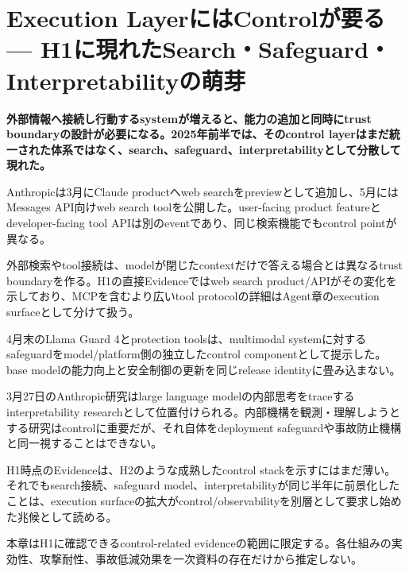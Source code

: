 \section{Execution LayerにはControlが要る — H1に現れたSearch・Safeguard・Interpretabilityの萌芽}
\noindent\textbf{外部情報へ接続し行動するsystemが増えると、能力の追加と同時にtrust boundaryの設計が必要になる。2025年前半では、そのcontrol layerはまだ統一された体系ではなく、search、safeguard、interpretabilityとして分散して現れた。}\autocite{src-383476bdf62e,src-6e15bd50b7db,src-fdc10e3226e6}

Anthropicは3月にClaude productへweb searchをpreviewとして追加し、5月にはMessages API向けweb search toolを公開した。user-facing product featureとdeveloper-facing tool APIは別のeventであり、同じ検索機能でもcontrol pointが異なる。\autocite{src-6e15bd50b7db,src-e31c642d34b6}


外部検索やtool接続は、modelが閉じたcontextだけで答える場合とは異なるtrust boundaryを作る。H1の直接Evidenceではweb search product/APIがその変化を示しており、MCPを含むより広いtool protocolの詳細はAgent章のexecution surfaceとして分けて扱う。\autocite{src-6e15bd50b7db,src-e31c642d34b6}


4月末のLlama Guard 4とprotection toolsは、multimodal systemに対するsafeguardをmodel/platform側の独立したcontrol componentとして提示した。base modelの能力向上と安全制御の更新を同じrelease identityに畳み込まない。\autocite{src-383476bdf62e}


3月27日のAnthropic研究はlarge language modelの内部思考をtraceするinterpretability researchとして位置付けられる。内部機構を観測・理解しようとする研究はcontrolに重要だが、それ自体をdeployment safeguardや事故防止機構と同一視することはできない。\autocite{src-fdc10e3226e6}


H1時点のEvidenceは、H2のような成熟したcontrol stackを示すにはまだ薄い。それでもsearch接続、safeguard model、interpretabilityが同じ半年に前景化したことは、execution surfaceの拡大がcontrol/observabilityを別層として要求し始めた兆候として読める。\autocite{src-383476bdf62e,src-e31c642d34b6,src-fdc10e3226e6}


\begin{claimboundary}
本章はH1に確認できるcontrol-related evidenceの範囲に限定する。各仕組みの実効性、攻撃耐性、事故低減効果を一次資料の存在だけから推定しない。
\end{claimboundary}
